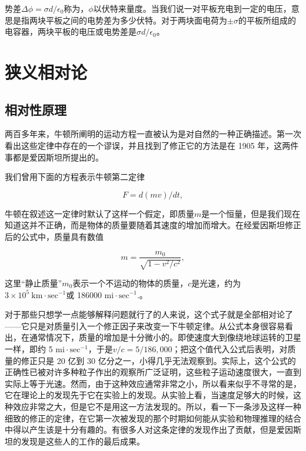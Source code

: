 \documentclass[12pt,oneside]{book}
\begin{document}
势差$\Delta\phi=\sigma d/\epsilon_0$称为，$\phi$以伏特来量度。当我们说一对平板充电到一定的电压，意思是指两块平板之间的电势差为多少伏特。对于两块面电荷为$\pm \sigma$的平板所组成的电容器，两块平板的电压或电势差是$\sigma d/\epsilon_0$。



\chapter{狭义相对论}
\section{相对性原理}
两百多年来，牛顿所阐明的运动方程一直被认为是对自然的一种正确描述。第一次看出这些定律中存在的一个谬误，并且找到了修正它的方法是在 1905 年，这两件事都是爱因斯坦所提出的。


我们曾用下面的方程表示牛顿第二定律

\begin{equation*}
F=d(mv)/dt,
\end{equation*}

牛顿在叙述这一定律时默认了这样一个假定，即质量$m$是一个恒量，但是我们现在知道这并不正确，而是物体的质量要随着其速度的增加而增大。在经爱因斯坦修正后的公式中，质量具有数值


\begin{equation}
\label{Eq:I:15:1}
m=\frac{m_0}{\sqrt{1-v^2/c^2}},
\end{equation}

这里“静止质量”$m_0$表示一个不运动的物体的质量，$c$是光速，约为$3\times10^5\ \text{km}\cdot\text{sec}^{-1}$或 186000 $\text{mi}\cdot\text{sec}^{-1}.$。


对于那些只想学一点能够解释问题就行了的人来说，这个式子就是全部相对论了——它只是对质量引入一个修正因子来改变一下牛顿定律。从公式本身很容易看出，在通常情况下，质量的增加是十分微小的。即使速度大到像绕地球运转的卫星一样，即约 5 $\text{mi} \cdot \text{sec}^{-1}$，于是$v/c = 5/186{,}000$；把这个值代入公式后表明，对质量的修正只是 20 亿到 30 亿分之一，小得几乎无法观察到。实际上，这个公式的正确性已被对许多种粒子作出的观察所广泛证明，这些粒子运动速度很大，一直到实际上等于光速。然而，由于这种效应通常非常之小，所以看来似乎不寻常的是，它在理论上的发现先于它在实验上的发现。从实验上看，当速度足够大的时候，这种效应非常之大，但是它不是用这一方法发现的。所以，看一下一条涉及这样一种细致的修正的定律，在它第一次被发现的那个时期如何能从实验和物理推理的结合中得以产生该是十分有趣的。有很多人对这条定律的发现作出了贡献，但是爱因斯坦的发现是这些人的工作的最后成果。
\end{document}
